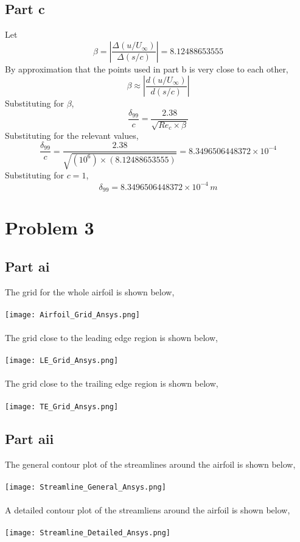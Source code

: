 \documentclass[a4paper, 12pt]{report}
\def\be{\beta}
\def\f{\frac}
\def\l{\left}
\def\r{\right}
\def\sized{0.22}
\def\sizes{0.29}
\let\stdsection\section
\renewcommand\section{\newpage\stdsection}
\begin{document}
\begin{center}
\subsection{Part c}
Let
$$\be = \l|\f{\Delta(u/U_\infty)}{\Delta(s/c)}\r| = 8.12488653555$$
By approximation that the points used in part b is very close to each other,
$$\be \approx \l|\f{d(u/U_\infty)}{d(s/c)}\r| $$
Substituting for $\be$,
$$\f{\delta_{99}}{c} = \f{2.38}{\sqrt{Re_c\times \be}}$$
Substituting for the relevant values,
$$\f{\delta_{99}}{c} = \f{2.38}{\sqrt{(10^6)\times (8.12488653555)}} = 8.3496506448372\times 10^{-4}$$
Substituting for $c = 1$,
$$\delta_{99} = 8.3496506448372\times 10^{-4}\,m$$
\section{Problem 3}
\begin{comment}
\end{comment}
\subsection{Part ai}
The grid for the whole airfoil is shown below,
\\~\\\texttt{[image: Airfoil\_Grid\_Ansys.png]}
\\~\\The grid close to the leading edge region is shown below,
\\~\\\texttt{[image: LE\_Grid\_Ansys.png]}
\\~\\The grid close to the trailing edge region is shown below,
\\~\\\texttt{[image: TE\_Grid\_Ansys.png]}
\subsection{Part aii}
The general contour plot of the streamlines around the airfoil is shown below,
\\~\\\texttt{[image: Streamline\_General\_Ansys.png]}
\\~\\A detailed contour plot of the streamliens around the airfoil is shown below,
\\~\\\texttt{[image: Streamline\_Detailed\_Ansys.png]}

\end{center}
\end{document}
